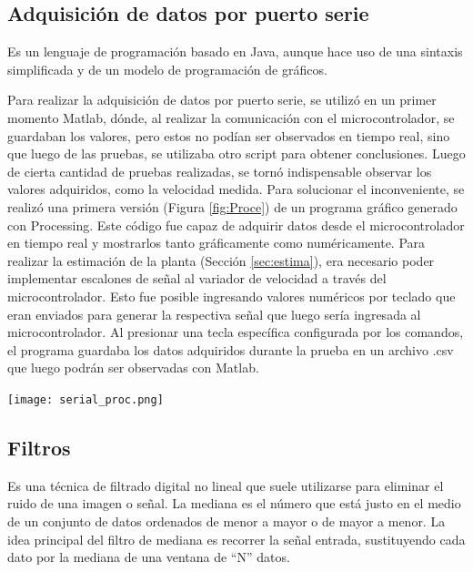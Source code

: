 \subsection{Adquisición de datos por puerto serie}
\begin{tcolorbox}[colback=blue!5!white,colframe=blue!75!black,title=Processing]
	Es un lenguaje de programación basado en Java, aunque hace uso de una sintaxis simplificada y de un modelo de programación de gráficos.
\end{tcolorbox}
Para realizar la adquisición de datos por puerto serie, se utilizó en un primer momento Matlab, dónde, al realizar la comunicación con el microcontrolador, se guardaban los valores, pero estos no podían ser observados en tiempo real, sino que luego de las pruebas, se utilizaba otro script para obtener conclusiones. Luego de cierta cantidad de pruebas realizadas, se tornó indispensable observar los valores adquiridos, como la velocidad medida. Para solucionar el inconveniente, se realizó una primera versión (Figura \ref{fig:Proce}) de un programa gráfico generado con Processing. Este código fue capaz de adquirir datos desde el microcontrolador en tiempo real y mostrarlos tanto gráficamente como numéricamente. Para realizar la estimación de la planta (Sección \ref{sec:estima}), era necesario poder implementar escalones de señal al variador de velocidad a través del microcontrolador. Esto fue posible ingresando valores numéricos por teclado que eran enviados para generar la respectiva señal que luego sería ingresada al microcontrolador.
Al presionar una tecla específica configurada por los comandos, el programa guardaba los datos adquiridos durante la prueba en un archivo .csv que luego podrán ser observadas con Matlab.

\begin{center}
	\texttt{[image: serial\_proc.png]}
	\label{fig:Proce}    
\end{center}




\subsection{Filtros}
\begin{tcolorbox}[colback=blue!5!white,colframe=blue!75!black,title=Mediana]
	Es una técnica de filtrado digital no lineal que suele utilizarse para eliminar el ruido de una imagen o señal. La mediana es el número que está justo en el medio de un conjunto de datos ordenados de menor a mayor o de mayor a menor.
	La idea principal del filtro de mediana es recorrer la señal entrada, sustituyendo cada dato por la mediana de una ventana de “N” datos.
\end{tcolorbox}


